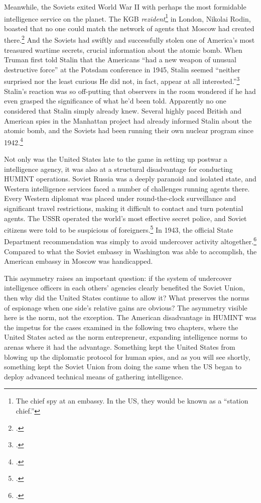 \documentclass{memoir}
\begin{document}
\begin{refsegment}
Meanwhile, the Soviets exited World War II with perhaps the most formidable intelligence service on the planet. The KGB \emph{rezident}\footnote{The chief spy at an embassy. In the US, they would be known as a ``station chief.''} in London, Nikolai Rodin, boasted that no one could match the network of agents that Moscow had created there.\footcite[p.~151]{haslam_near_2015} And the Soviets had swiftly and successfully stolen one of America's most treasured wartime secrets, crucial information about the atomic bomb. When Truman first told Stalin that the Americans ``had a new weapon of unusual destructive force'' at the Potsdam conference in 1945, Stalin seemed ``neither surprised nor the least curious \textelp{} He did not, in fact, appear at all interested.''\footcite[p.~443]{mccullough_truman_1992}  Stalin's reaction was so off-putting that observers in the room wondered if he had even grasped the significance of what he'd been told. Apparently no one considered that Stalin simply already knew. Several highly paced British and American spies in the Manhattan project had already informed Stalin about the atomic bomb, and the Soviets had been running their own nuclear program since 1942.\footcite[p.~443]{mccullough_truman_1992}

Not only was the United States late to the game in setting up postwar a intelligence agency, it was also at a structural disadvantage for conducting HUMINT operations. Soviet Russia was a deeply paranoid and isolated state, and Western intelligence services faced a number of challenges running agents there. Every Western diplomat was placed under round-the-clock surveillance and significant travel restrictions, making it difficult to contact and turn potential agents. The USSR operated the world's most effective secret police, and Soviet citizens were told to be suspicious of foreigners.\footcite[p.~42]{richelson_american_1987} In 1943, the official State Department recommendation was simply to avoid undercover activity altogether.\footcite[p.~44]{richelson_american_1987} Compared to what the Soviet embassy in Washington was able to accomplish, the American embassy in Moscow was handicapped.

This asymmetry raises an important question: if the system of undercover intelligence officers in each others' agencies clearly benefited the Soviet Union, then why did the United States continue to allow it? What preserves the norms of espionage when one side's relative gains are obvious? The asymmetry visible here is the norm, not the exception. The American disadvantage in HUMINT was the impetus for the cases examined in the following two chapters, where the United States acted as the norm entrepreneur, expanding intelligence norms to arenas where it had the advantage. Something kept the United States from blowing up the diplomatic protocol for human spies, and as you will see shortly, something kept the Soviet Union from doing the same when the US began to deploy advanced technical means of gathering intelligence.


\end{refsegment}
\end{document}
